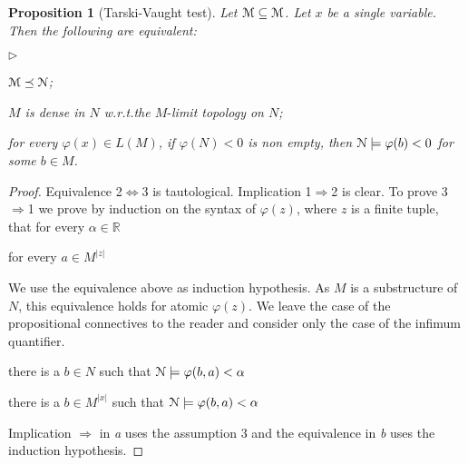 \documentclass[12pt,letterpaper,oneside,reqno]{amsart}
\newcommand{\mylabel}[1]{{#1}\hfill}
\renewenvironment{itemize}
  {\begin{list}{$\triangleright$}{%
   \setlength{\parskip}{0mm}
   \setlength{\topsep}{.2\baselineskip}
   \setlength{\rightmargin}{0mm}
   \setlength{\listparindent}{0mm}
   \setlength{\itemindent}{0mm}
   \setlength{\labelwidth}{3ex}
   \setlength{\itemsep}{.2\baselineskip}
   \setlength{\parsep}{.2\baselineskip}
   \setlength{\partopsep}{0mm}
   \setlength{\labelsep}{1ex}
   \setlength{\leftmargin}{\labelwidth+\labelsep}
   \let\makelabel\mylabel}}{%
   \end{list}}
\theoremstyle{plain}
\newtheorem{proposition}[theorem]{Proposition}
\newtheorem{remark}[theorem]{Remark}
\theoremstyle{remark}
\begin{document}
\begin{proposition}[Tarski-Vaught test]\label{prop_Tarski-Vaught} Let ${\EuScript M}\subseteq{\EuScript M}$.
  Let $x$ be a single variable.
  Then the following are equivalent:
  \begin{itemize}
    \item[1.] ${\EuScript M}\preceq{\EuScript N}$;
    \item[2.] $M$ is dense in $N$ w.r.t.\@ the $M\mbox{-}$limit topology on $N$;
    \item[3.] for every $\varphi(x)\in L(M)$, if $\varphi(N)<0$ is non empty, then ${\EuScript N}\models\varphi(b)<0$ for some $b\in M$.
  \end{itemize}
\end{proposition}
\begin{proof}
  Equivalence 2$\Leftrightarrow$3 is tautological.
  Implication 1$\Rightarrow$2 is clear.
  To prove 3$\Rightarrow$1 we prove by induction on the syntax of $\varphi(z)$, where $z$ is a finite tuple, that for every $\alpha\in{\mathds R}$

   \hfill for every $a\in M^{|z|}$

  We use the equivalence above as induction hypothesis.
  As $M$ is a substructure of $N$, this equivalence holds for atomic $\varphi(z)$.
  We leave the case of the propositional connectives to the reader and consider only the case of the infimum quantifier.

   there is a $b\in N$ such that ${\EuScript N}\models\varphi(b,a)<\alpha$

   there is a $b\in M^{|x|}$ such that ${\EuScript N}\models\varphi(b,a)<\alpha$


  Implication $\Rightarrow$ in \textit{a} uses the assumption 3 and the equivalence in \textit{b} uses the induction hypothesis.
\end{proof}

\end{document}
